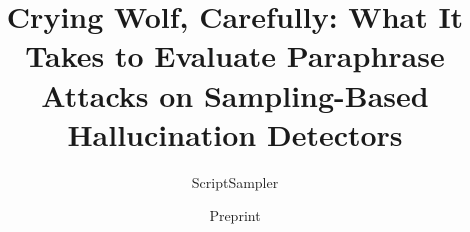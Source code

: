 \documentclass[10pt,letterpaper]{article}
\title{\bfseries Crying Wolf, Carefully: What It Takes to Evaluate Paraphrase Attacks on
Sampling-Based Hallucination Detectors}
\author{ScriptSampler}
\date{\normalsize Preprint}
\begin{document}
\maketitle

\begin{abstract}
%
%

\end{abstract}
\end{document}
